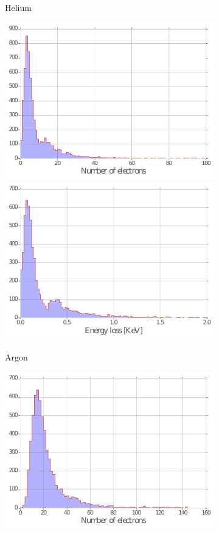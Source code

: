 \begin{figure}[H]
\begin{subfigure}{\linewidth}
			\caption{\label{fig:Primary:A} Helium}
		\end{subfigure}
		\begin{subfigure}{\linewidth}
			\centering
			\includegraphics[width = 0.5\plotwidth]{fig/chapt4/N_elec_Argon.pdf}
			\includegraphics[width = 0.5\plotwidth]{fig/chapt4/E_loss_Argon.pdf}
			\caption{\label{fig:Primary:B} Argon}
		\end{subfigure}
		\begin{subfigure}{\linewidth}
			\centering
			\includegraphics[width = 0.5\plotwidth]{fig/chapt4/N_elec_RPC.pdf}

\end{subfigure}
\end{figure}

